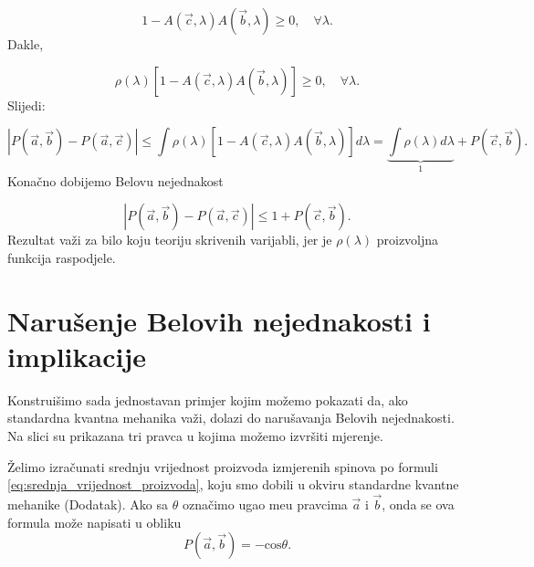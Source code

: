 \begin{equation}
    1 - A(\vec{c}, \lambda) A(\vec{b}, \lambda) \ge 0 , \quad \forall \lambda.
\end{equation}
Dakle,

\begin{equation}
    \rho (\lambda)[1 - A(\vec{c}, \lambda) A(\vec{b}, \lambda) ] \ge 0, \quad \forall \lambda.
\end{equation}
Slijedi:


\begin{equation}
    \left|{P(\vec{a}, \vec{b}) - P(\vec{a}, \vec{c})}\right| \le  \int  \rho (\lambda)  [1- A(\vec{c}, \lambda) A(\vec{b}, \lambda)  ]  d\lambda = \underbrace{\int \rho(\lambda)d\lambda}_{1} + P(\vec{c}, \vec{b}).
\end{equation}
Konačno dobijemo Belovu nejednakost

\begin{equation}
    \left|{P(\vec{a}, \vec{b}) - P(\vec{a}, \vec{c})}\right| \le 1 +  P(\vec{c}, \vec{b}).
\end{equation}
Rezultat važi za bilo koju teoriju skrivenih varijabli, jer je $\rho(\lambda)$ proizvoljna funkcija raspodjele.

\section{Narušenje Belovih nejednakosti i implikacije}

Konstruišimo sada jednostavan primjer kojim možemo pokazati da, ako standardna kvantna mehanika važi,  dolazi do narušavanja Belovih nejednakosti. Na slici
su prikazana tri pravca u kojima možemo izvršiti mjerenje.

Želimo izračunati srednju vrijednost proizvoda izmjerenih spinova po formuli \eqref{eq:srednja_vrijednost_proizvoda}, koju smo dobili u okviru standardne kvantne mehanike (Dodatak).
Ako sa $\theta$ ozna\v cimo ugao me\dj u pravcima $\vec{a}$ i $\vec{b}$, onda se ova formula mo\v ze napisati u obliku
\begin{equation}
    P(\vec{a},\vec{b}) = -\mathrm{cos}\theta.
\end{equation}\\


